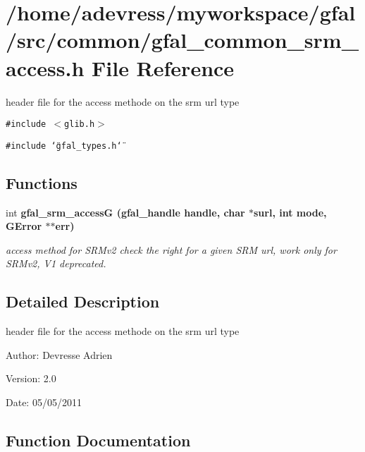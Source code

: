 \section{/home/adevress/myworkspace/gfal/src/common/gfal\_\-common\_\-srm\_\-access.h File Reference}
\label{gfal__common__srm__access_8h}
header file for the access methode on the srm url type 

{\tt \#include $<$glib.h$>$}\par
{\tt \#include \char`\"{}gfal\_\-types.h\char`\"{}}\par
\subsection*{Functions}
\begin{CompactItemize}
\item 
int \bf{gfal\_\-srm\_\-access\-G} (gfal\_\-handle handle, char $\ast$surl, int mode, GError $\ast$$\ast$err)
\begin{CompactList}\small\item\em access method for SRMv2 check the right for a given SRM url, work only for SRMv2, V1 deprecated. \item\end{CompactList}\end{CompactItemize}


\subsection{Detailed Description}
header file for the access methode on the srm url type 

\begin{Desc}
\item[Author:]Devresse Adrien \end{Desc}
\begin{Desc}
\item[Version:]2.0 \end{Desc}
\begin{Desc}
\item[Date:]05/05/2011 \end{Desc}


\subsection{Function Documentation}
